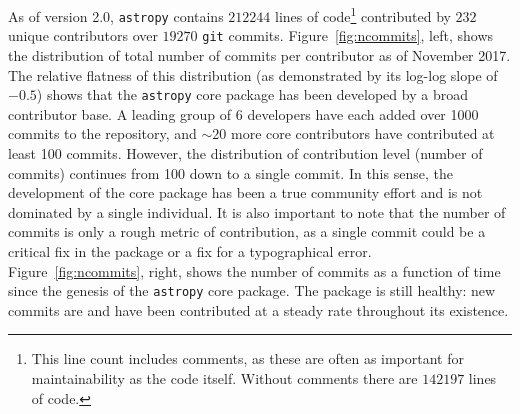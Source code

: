 \documentclass[modern]{aastex62}
\newcommand{\package}[1]{\texttt{#1}\xspace}
\newcommand{\astropypkg}{\package{astropy}}
\renewcommand{\figurename}{Figure\xspace}
\begin{document}
As of version 2.0, \astropypkg contains $212244$ lines of code\footnote{This
line count includes comments, as these are often as important for
maintainability as the code itself.  Without comments there are $142197$ lines
of code.} contributed by $232$ unique contributors over $19270$ \texttt{git}
commits.
\figurename~\ref{fig:ncommits}, left, shows the distribution of total number of
commits per contributor as of November 2017.
The relative flatness of this distribution (as demonstrated by its log-log slope of
$-0.5$) shows that the \astropypkg core package has been developed by a broad
contributor base.  A leading group of 6 developers have each added over 1000
commits to the repository, and $\sim 20$ more core contributors have contributed
at least 100 commits.
However, the distribution of contribution level (number of commits) continues
from 100 down to a single commit.
In this sense, the development of the core package has been a true community
effort and is not dominated by a single individual.
It is also important to note that the number of commits is only a rough metric
of contribution, as a single commit could be a critical fix in the package or a
fix for a typographical error.
\figurename~\ref{fig:ncommits}, right, shows the number of commits as a
function of time since the genesis of the \astropypkg core package.
The package is still healthy: new commits are and have been contributed at a
steady rate throughout its existence.
\end{document}
